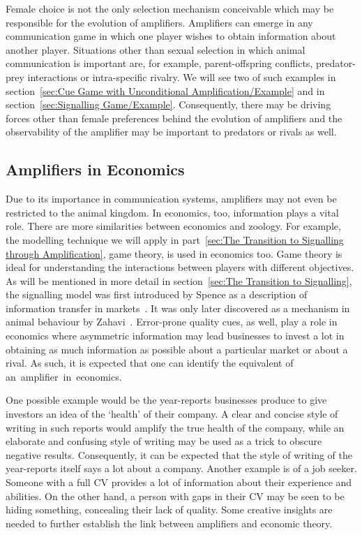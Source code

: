\documentclass[a4paper,12pt]{article}
\numberwithin{equation}{section}
\begin{document}
Female choice is not the only selection mechanism conceivable which may be responsible for the evolution of amplifiers. Amplifiers can emerge in any communication game in which one player wishes to obtain information about another player. Situations other than sexual selection in which animal communication is important are, for example, parent-offspring conflicts, predator-prey interactions or intra-specific rivalry. We will see two of such examples in section~\ref{sec:Cue Game with Unconditional Amplification/Example} and in section~\ref{sec:Signalling Game/Example}. Consequently, there may be driving forces other than female preferences behind the evolution of amplifiers and the observability of the amplifier may be important to predators or rivals as well.


\subsection{Amplifiers in Economics}
\label{sec:Amplifiers in Economics}

\enlargethispage*{10mm}

Due to its importance in communication systems, amplifiers may not even be restricted to the animal kingdom. In economics, too, information plays a vital role. There are more similarities between economics and zoology. For example, the modelling technique we will apply in part~\ref{sec:The Transition to Signalling through Amplification}, game theory, is used in economics too. Game theory is ideal for understanding the interactions between players with different objectives. As will be mentioned in more detail in section~\ref{sec:The Transition to Signalling}, the signalling model was first introduced by Spence as a description of information transfer in markets~\cite{Spence1973}. It was only later discovered as a mechanism in animal behaviour by Zahavi~\cite{Zahavi1975}. Error-prone quality cues, as well, play a role in economics where asymmetric information may lead businesses to invest a lot in obtaining as much information as possible about a particular market or about a rival. As such, it is expected that one can identify the equivalent of an~amplifier~in~economics.

One possible example would be the year-reports businesses produce to give investors an idea of the `health' of their company. A clear and concise style of writing in such reports would amplify the true health of the company, while an elaborate and confusing style of writing may be used as a trick to obscure negative results. Consequently, it can be expected that the style of writing of the year-reports itself says a lot about a company. Another example is of a job seeker. Someone with a full CV provides a lot of information about their experience and abilities. On the other hand, a person with gaps in their CV may be seen to be hiding something, concealing their lack of quality. Some creative insights are needed to further establish the link between amplifiers and economic theory.
\end{document}
